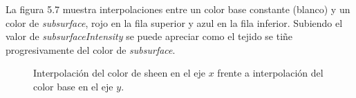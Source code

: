 La figura 5.7 muestra interpolaciones entre un color base constante (blanco) y un color de \textit{subsurface},
rojo en la fila superior y azul en la fila inferior. Subiendo el valor de \textit{subsurfaceIntensity}
se puede apreciar como el tejido se ti\~ne progresivamente del color de \textit{subsurface}.





\begin{figure}[H]
  \vspace{0.5cm}
  \centering
    \caption{Interpolaci\'on del color de sheen en el eje $x$ frente a interpolaci\'on del color base en el eje $y$.}
\end{figure}

